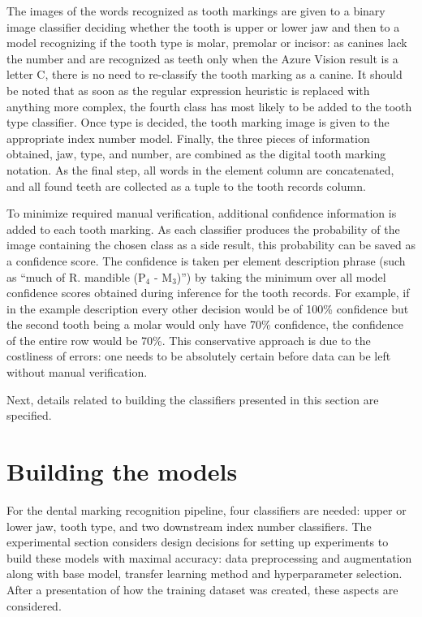 \documentclass[english,twoside,openright]{UH_DS_MSc}
\begin{document}
The images of the words recognized as tooth markings are given to a binary image classifier deciding whether the tooth 
is upper or lower jaw and then to a model recognizing if the tooth type is molar, premolar or incisor: as 
canines lack the number and are recognized as teeth only when the Azure Vision result is a letter C, there is 
no need to re-classify the tooth marking as a canine. It should be noted that as soon as the regular expression
heuristic is replaced with anything more complex, the fourth class has most likely to be added to the tooth type classifier.
Once type is decided, the tooth marking image is given to the appropriate index number model. Finally, 
the three pieces of information obtained, jaw, type, and number, are combined as the digital tooth marking 
notation. As the final step, all words in the element column are concatenated, and all found teeth are 
collected as a tuple to the tooth records column.

To minimize required manual verification, additional confidence information is added 
to each tooth marking. As each classifier produces the probability of the image containing the 
chosen class as a side result, this probability can be saved as a confidence score. The confidence is taken 
per element description phrase (such as ``much of R. mandible ($\text{P}_4$ - $\text{M}_3$)'') by taking the minimum over all 
model confidence scores obtained during inference for the tooth records. For example, if in the 
example description every other decision would be of 100\% confidence but the second tooth being a molar 
would only have 70\% confidence, the confidence of the entire row would be 70\%. This conservative approach is 
due to the costliness of errors: one needs to be absolutely certain before data can be left without manual 
verification.

Next, details related to building the classifiers presented in this section are specified.

\section{Building the models}
\label{sect:building-models}


For the dental marking recognition pipeline, four classifiers are needed: upper or lower jaw, 
tooth type, and two downstream index number classifiers. The experimental 
section considers design decisions for setting up experiments to build these models with maximal accuracy:
 data preprocessing and augmentation along with base model,
transfer learning method and hyperparameter selection. After a presentation of  how the training dataset was created, these aspects are considered.
\end{document}
